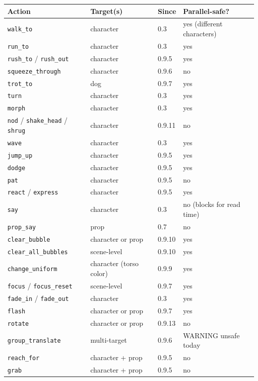 \documentclass[
  11pt,
]{book}
\begin{document}
\begin{longtable}[]{@{}llll@{}}
\toprule\noalign{}
Action & Target(s) & Since & Parallel-safe? \\
\midrule\noalign{}
\endhead
\bottomrule\noalign{}
\endlastfoot
\texttt{walk\_to} & character & 0.3 & yes (different characters) \\
\texttt{run\_to} & character & 0.3 & yes \\
\texttt{rush\_to} / \texttt{rush\_out} & character & 0.9.5 & yes \\
\texttt{squeeze\_through} & character & 0.9.6 & no \\
\texttt{trot\_to} & dog & 0.9.7 & yes \\
\texttt{turn} & character & 0.3 & yes \\
\texttt{morph} & character & 0.3 & yes \\
\texttt{nod} / \texttt{shake\_head} / \texttt{shrug} & character &
0.9.11 & no \\
\texttt{wave} & character & 0.3 & yes \\
\texttt{jump\_up} & character & 0.9.5 & yes \\
\texttt{dodge} & character & 0.9.5 & yes \\
\texttt{pat} & character & 0.9.5 & no \\
\texttt{react} / \texttt{express} & character & 0.9.5 & yes \\
\texttt{say} & character & 0.3 & no (blocks for read time) \\
\texttt{prop\_say} & prop & 0.7 & no \\
\texttt{clear\_bubble} & character or prop & 0.9.10 & yes \\
\texttt{clear\_all\_bubbles} & scene-level & 0.9.10 & yes \\
\texttt{change\_uniform} & character (torso color) & 0.9.9 & yes \\
\texttt{focus} / \texttt{focus\_reset} & scene-level & 0.9.7 & yes \\
\texttt{fade\_in} / \texttt{fade\_out} & character & 0.3 & yes \\
\texttt{flash} & character or prop & 0.9.7 & yes \\
\texttt{rotate} & character or prop & 0.9.13 & no \\
\texttt{group\_translate} & multi-target & 0.9.6 & WARNING unsafe
today \\
\texttt{reach\_for} & character + prop & 0.9.5 & no \\
\texttt{grab} & character + prop & 0.9.5 & no \\

\end{longtable}
\end{document}
